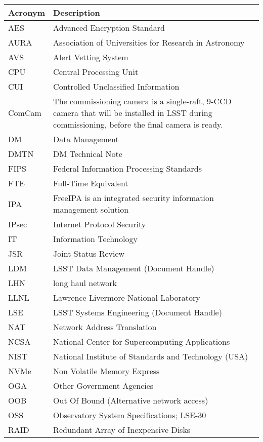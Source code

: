\addtocounter{table}{-1}
\begin{longtable}{p{}p{}}\hline
\textbf{Acronym} & \textbf{Description}  \\\hline

AES & Advanced Encryption Standard \\\hline
AURA & Association of Universities for Research in Astronomy \\\hline
AVS & Alert Vetting System \\\hline
CPU & Central Processing Unit \\\hline
CUI & Controlled Unclassified Information \\\hline
ComCam & The commissioning camera is a single-raft, 9-CCD camera that will be installed in LSST during commissioning, before the final camera is ready. \\\hline
DM & Data Management \\\hline
DMTN & DM Technical Note \\\hline
FIPS & Federal Information Processing Standards \\\hline
FTE & Full-Time Equivalent \\\hline
IPA & FreeIPA is an integrated security information management solution \\\hline
IPsec & Internet Protocol Security \\\hline
IT & Information Technology \\\hline
JSR & Joint Status Review \\\hline
LDM & LSST Data Management (Document Handle) \\\hline
LHN & long haul network \\\hline
LLNL & Lawrence Livermore National Laboratory \\\hline
LSE & LSST Systems Engineering (Document Handle) \\\hline
NAT & Network Address Translation \\\hline
NCSA & National Center for Supercomputing Applications \\\hline
NIST & National Institute of Standards and Technology (USA) \\\hline
NVMe & Non Volatile Memory Express \\\hline
OGA & Other Government Agencies \\\hline
OOB & Out Of Bound (Alternative network access) \\\hline
OSS & Observatory System Specifications; LSE-30 \\\hline
RAID & Redundant Array of Inexpensive Disks \\\hline

\end{longtable}
